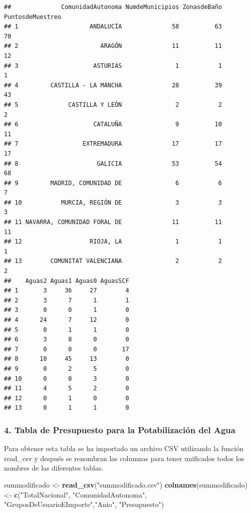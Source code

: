 \documentclass[
]{article}
\newenvironment{Shaded}{\begin{snugshade}}{\end{snugshade}}
\newcommand{\FunctionTok}[1]{\textcolor[rgb]{0.13,0.29,0.53}{\textbf{#1}}}
\newcommand{\NormalTok}[1]{#1}
\newcommand{\OtherTok}[1]{\textcolor[rgb]{0.56,0.35,0.01}{#1}}
\newcommand{\StringTok}[1]{\textcolor[rgb]{0.31,0.60,0.02}{#1}}
\begin{document}
\begin{verbatim}
##              ComunidadAutonoma NumdeMunicipios ZonasdeBaño PuntosdeMuestreo
## 1                    ANDALUCÍA              58          63               70
## 2                       ARAGÓN              11          11               12
## 3                     ASTURIAS               1           1                1
## 4         CASTILLA - LA MANCHA              28          39               43
## 5              CASTILLA Y LEÓN               2           2                2
## 6                     CATALUÑA               9          10               11
## 7                  EXTREMADURA              17          17               17
## 8                      GALICIA              53          54               68
## 9         MADRID, COMUNIDAD DE               6           6                7
## 10           MURCIA, REGIÓN DE               3           3                3
## 11 NAVARRA, COMUNIDAD FORAL DE              11          11               11
## 12                   RIOJA, LA               1           1                1
## 13        COMUNITAT VALENCIANA               2           2                2
##    Aguas2 Aguas1 Aguas0 AguasSCF
## 1       3     36     27        4
## 2       3      7      1        1
## 3       0      0      1        0
## 4      24      7     12        0
## 5       0      1      1        0
## 6       3      8      0        0
## 7       0      0      0       17
## 8      10     45     13        0
## 9       0      2      5        0
## 10      0      0      3        0
## 11      4      5      2        0
## 12      0      1      0        0
## 13      0      1      1        0
\end{verbatim}

\hypertarget{tabla-de-presupuesto-para-la-potabilizaciuxf3n-del-agua}{%
\subsubsection{4. Tabla de Presupuesto para la Potabilización del
Agua}\label{tabla-de-presupuesto-para-la-potabilizaciuxf3n-del-agua}}

Para obtener esta tabla se ha importado un archivo CSV utilizando la
función read\_csv y después se renombran las columnas para tener
unificados todos los nombres de las diferentes tablas.

\begin{Shaded}
\begin{Highlighting}[]
\NormalTok{summodificado }\OtherTok{\textless{}{-}} \FunctionTok{read\_csv}\NormalTok{(}\StringTok{"summodificado.csv"}\NormalTok{)}
\FunctionTok{colnames}\NormalTok{(summodificado) }\OtherTok{\textless{}{-}} \FunctionTok{c}\NormalTok{(}\StringTok{"TotalNacional"}\NormalTok{, }\StringTok{"ComunidadAutonoma"}\NormalTok{, }\StringTok{"GruposDeUsuarioEImporte"}\NormalTok{,}\StringTok{"Anio"}\NormalTok{, }\StringTok{"Presupuesto"}\NormalTok{)}
\end{Highlighting}
\end{Shaded}
\end{document}
